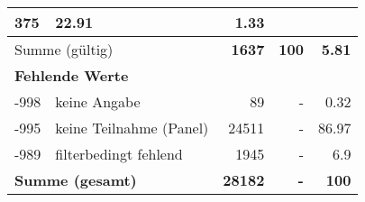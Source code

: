 \begin{longtable}{lXrrr}
       \num{375} &
       \num[round-mode=places,round-precision=2]{22,91} &
         \num[round-mode=places,round-precision=2]{1,33} \\
     \midrule
     \multicolumn{2}{l}{Summe (gültig)} &
       \textbf{\num{1637}} &
     \textbf{100} &
       \textbf{\num[round-mode=places,round-precision=2]{5,81}} \\
     \multicolumn{5}{l}{\textbf{Fehlende Werte}}\\
       -998 &
       keine Angabe &
         \num{89} &
        - &
         \num[round-mode=places,round-precision=2]{0,32} \\
       -995 &
       keine Teilnahme (Panel) &
         \num{24511} &
        - &
         \num[round-mode=places,round-precision=2]{86,97} \\
       -989 &
       filterbedingt fehlend &
         \num{1945} &
        - &
         \num[round-mode=places,round-precision=2]{6,9} \\
     \midrule
     \multicolumn{2}{l}{\textbf{Summe (gesamt)}} &
          \textbf{\num{28182}} &
        \textbf{-} &
        \textbf{100} \\
     \bottomrule
     \end{longtable}
     
